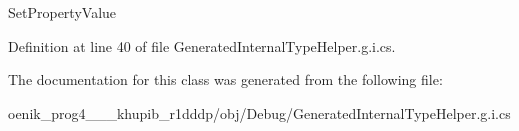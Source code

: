 Set\+Property\+Value 



Definition at line 40 of file Generated\+Internal\+Type\+Helper.\+g.\+i.\+cs.



The documentation for this class was generated from the following file\+:\begin{DoxyCompactItemize}
\item 
oenik\+\_\+prog4\+\_\+\_\+\_\+khupib\+\_\+r1dddp/obj/\+Debug/Generated\+Internal\+Type\+Helper.\+g.\+i.\+cs\end{DoxyCompactItemize}
